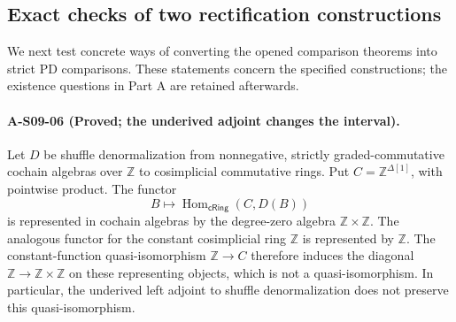 \subsection{Exact checks of two rectification constructions}

We next test concrete ways of converting the opened comparison
theorems into strict PD comparisons.  These statements concern the
specified constructions; the existence questions in Part A are
retained afterwards.

\paragraph{A-S09-06 (Proved; the underived adjoint changes the interval).}
Let $D$ be shuffle denormalization from nonnegative, strictly
graded-commutative cochain algebras over $\mathbb Z$ to cosimplicial
commutative rings.  Put $C=\mathbb Z^{\Delta[1]}$, with pointwise
product.  The functor
\[
 B\longmapsto\operatorname{Hom}_{\mathsf{cRing}}(C,D(B))
\]
is represented in cochain algebras by the degree-zero algebra
$\mathbb Z\times\mathbb Z$.  The analogous functor for the constant
cosimplicial ring $\mathbb Z$ is represented by $\mathbb Z$.
The constant-function quasi-isomorphism
$\mathbb Z\to C$ therefore induces the diagonal
$\mathbb Z\to\mathbb Z\times\mathbb Z$ on these representing objects,
which is not a quasi-isomorphism.  In particular, the underived left
adjoint to shuffle denormalization does not preserve this
quasi-isomorphism.

